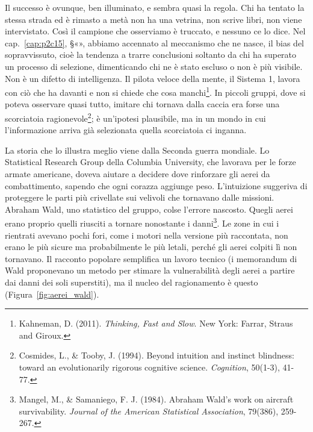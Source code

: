 Il successo è ovunque, ben illuminato, e sembra quasi la regola. Chi ha tentato la stessa strada ed è rimasto a metà non ha una vetrina, non scrive libri, non viene intervistato. Così il campione che osserviamo è truccato, e nessuno ce lo dice. Nel cap.~\ref{cap:p2c15}, §«», abbiamo accennato al meccanismo che ne nasce, il bias del sopravvissuto, cioè la tendenza a trarre conclusioni soltanto da chi ha superato un processo di selezione, dimenticando chi ne è stato escluso o non è più visibile. Non è un difetto di intelligenza. Il pilota veloce della mente, il Sistema 1, lavora con ciò che ha davanti e non si chiede che cosa manchi\footnote{Kahneman, D. (2011). \textit{Thinking, Fast and Slow}. New York: Farrar, Straus and Giroux.}. In piccoli gruppi, dove si poteva osservare quasi tutto, imitare chi tornava dalla caccia era forse una scorciatoia ragionevole\footnote{Cosmides, L., \& Tooby, J. (1994). Beyond intuition and instinct blindness: toward an evolutionarily rigorous cognitive science. \textit{Cognition}, 50(1-3), 41-77.}; è un'ipotesi plausibile, ma in un mondo in cui l'informazione arriva già selezionata quella scorciatoia ci inganna.

La storia che lo illustra meglio viene dalla Seconda guerra mondiale. Lo Statistical Research Group della Columbia University, che lavorava per le forze armate americane, doveva aiutare a decidere dove rinforzare gli aerei da combattimento, sapendo che ogni corazza aggiunge peso. L'intuizione suggeriva di proteggere le parti più crivellate sui velivoli che tornavano dalle missioni. Abraham Wald, uno statistico del gruppo, colse l'errore nascosto. Quegli aerei erano proprio quelli riusciti a tornare nonostante i danni\footnote{Mangel, M., \& Samaniego, F. J. (1984). Abraham Wald's work on aircraft survivability. \textit{Journal of the American Statistical Association}, 79(386), 259-267.}. Le zone in cui i rientrati avevano pochi fori, come i motori nella versione più raccontata, non erano le più sicure ma probabilmente le più letali, perché gli aerei colpiti lì non tornavano. Il racconto popolare semplifica un lavoro tecnico (i memorandum di Wald proponevano un metodo per stimare la vulnerabilità degli aerei a partire dai danni dei soli superstiti), ma il nucleo del ragionamento è questo (Figura~\ref{fig:aerei_wald}).


